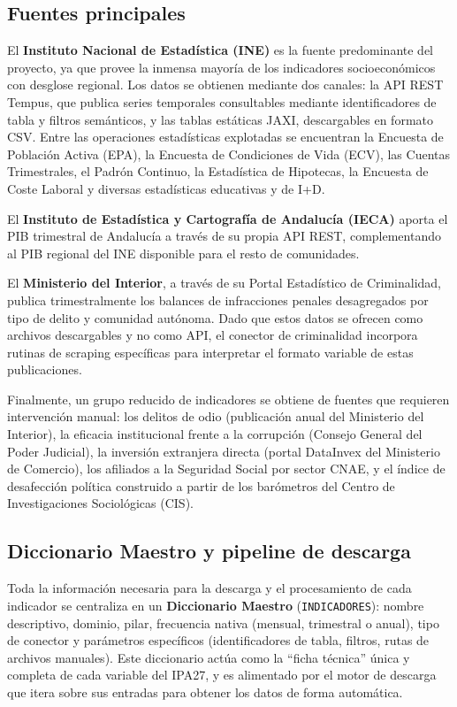 \documentclass[12pt,a4paper]{article}
\begin{document}
\subsection{Fuentes principales}

El \textbf{Instituto Nacional de Estadística (INE)} es la fuente predominante del proyecto, ya que provee la inmensa mayoría de los indicadores socioeconómicos con desglose regional. Los datos se obtienen mediante dos canales: la API REST Tempus, que publica series temporales consultables mediante identificadores de tabla y filtros semánticos, y las tablas estáticas JAXI, descargables en formato CSV. Entre las operaciones estadísticas explotadas se encuentran la Encuesta de Población Activa (EPA), la Encuesta de Condiciones de Vida (ECV), las Cuentas Trimestrales, el Padrón Continuo, la Estadística de Hipotecas, la Encuesta de Coste Laboral y diversas estadísticas educativas y de I+D.

El \textbf{Instituto de Estadística y Cartografía de Andalucía (IECA)} aporta el PIB trimestral de Andalucía a través de su propia API REST, complementando al PIB regional del INE disponible para el resto de comunidades.

El \textbf{Ministerio del Interior}, a través de su Portal Estadístico de Criminalidad, publica trimestralmente los balances de infracciones penales desagregados por tipo de delito y comunidad autónoma. Dado que estos datos se ofrecen como archivos descargables y no como API, el conector de criminalidad incorpora rutinas de scraping específicas para interpretar el formato variable de estas publicaciones.

Finalmente, un grupo reducido de indicadores se obtiene de fuentes que requieren intervención manual: los delitos de odio (publicación anual del Ministerio del Interior), la eficacia institucional frente a la corrupción (Consejo General del Poder Judicial), la inversión extranjera directa (portal DataInvex del Ministerio de Comercio), los afiliados a la Seguridad Social por sector CNAE, y el índice de desafección política construido a partir de los barómetros del Centro de Investigaciones Sociológicas (CIS).

\subsection{Diccionario Maestro y pipeline de descarga}

Toda la información necesaria para la descarga y el procesamiento de cada indicador se centraliza en un \textbf{Diccionario Maestro} (\texttt{INDICADORES}): nombre descriptivo, dominio, pilar, frecuencia nativa (mensual, trimestral o anual), tipo de conector y parámetros específicos (identificadores de tabla, filtros, rutas de archivos manuales). Este diccionario actúa como la ``ficha técnica'' única y completa de cada variable del IPA27, y es alimentado por el motor de descarga que itera sobre sus entradas para obtener los datos de forma automática.
\end{document}

